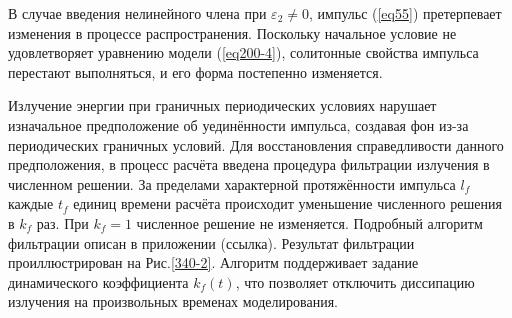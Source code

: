 \documentclass[14pt,a4paper]{extreport}
\begin{document}
			В случае введения нелинейного члена при \(\varepsilon_{2}\ne 0\), импульс (\ref{eq55}) претерпевает изменения в процессе распространения. Поскольку начальное условие не удовлетворяет уравнению модели (\ref{eq200-4}), солитонные свойства импульса перестают выполняться, и его форма постепенно изменяется. 
			
			Излучение энергии при граничных периодических условиях нарушает изначальное предположение об уединённости импульса, создавая фон из-за периодических граничных условий. Для восстановления справедливости данного предположения, в процесс расчёта введена процедура фильтрации излучения в численном решении. За пределами характерной протяжённости импульса \(l_{f}\) каждые \(t_{f}\) единиц времени расчёта происходит уменьшение численного решения в \(k_{f}\) раз. При \(k_{f}=1\) численное решение не изменяется. Подробный алгоритм фильтрации описан в приложении (ссылка). Результат фильтрации проиллюстрирован на Рис.\ref{340-2}. Алгоритм поддерживает задание динамического коэффициента \(k_{f}\left(t\right)\), что позволяет отключить диссипацию излучения на произвольных временах моделирования.
\end{document}
